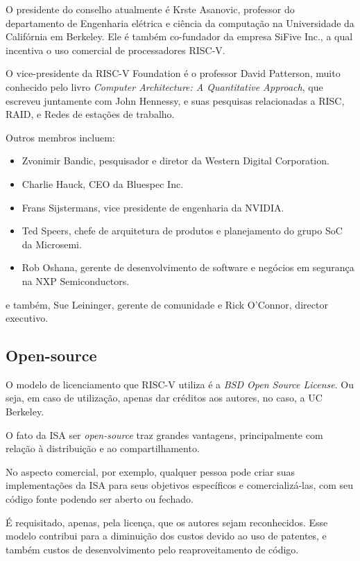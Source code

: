 		O presidente do conselho atualmente é Krste Asanovic, professor do departamento de Engenharia elétrica e ciência da computação na Universidade da Califórnia em Berkeley. Ele é também co-fundador da empresa SiFive Inc., a qual incentiva o uso comercial de processadores RISC-V.\

		O vice-presidente da RISC-V Foundation é o professor David Patterson, muito conhecido pelo livro \textit{Computer Architecture: A Quantitative Approach}, que escreveu juntamente com John Hennessy, e suas pesquisas relacionadas a RISC, RAID, e Redes de estações de trabalho.\

		Outros membros incluem:\
		\begin{itemize}  
			\item Zvonimir Bandic, pesquisador e diretor da Western Digital Corporation. 
			\item Charlie Hauck, CEO da Bluespec Inc.
			\item Frans Sijstermans, vice presidente de engenharia da NVIDIA.
			\item Ted Speers, chefe de arquitetura de produtos e planejamento do grupo SoC da Microsemi.
			\item Rob Oshana, gerente de desenvolvimento de software e negócios em segurança na NXP Semiconductors. 
		\end{itemize}

		e também, Sue Leininger, gerente de comunidade e Rick O’Connor, director executivo.~\cite{riscv_fboardmembers}

	\subsection{Open-source}
		
		O modelo de licenciamento que RISC-V utiliza é a \textit{BSD Open Source License}. Ou seja, em caso de utilização, apenas dar créditos aos autores, no caso, a UC Berkeley.~\cite{riscv_faq}

		O fato da ISA ser \textit{open-source} traz grandes vantagens, principalmente com relação à distribuição e ao compartilhamento.
		
		No aspecto comercial, por exemplo, qualquer pessoa pode criar suas implementações da ISA para seus objetivos específicos e comercializá-las, com seu código fonte podendo ser aberto ou fechado.

		É requisitado, apenas, pela licença, que os autores sejam reconhecidos. Esse modelo contribui para a diminuição dos custos devido ao uso de patentes, e também custos de desenvolvimento pelo reaproveitamento de código.

